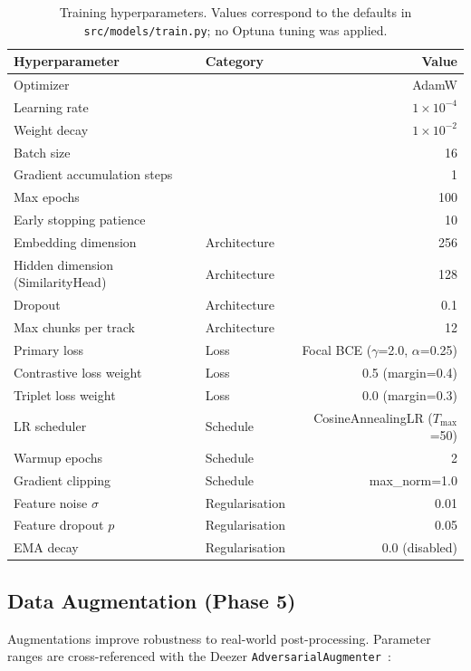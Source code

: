 \documentclass[11pt,a4paper]{article}
\begin{document}
\begin{table}[H]
\centering
\begin{tabular}{llr}
\toprule
\textbf{Hyperparameter} & \textbf{Category} & \textbf{Value} \\
\midrule
Optimizer & & AdamW \\
Learning rate & & $1 \times 10^{-4}$ \\
Weight decay & & $1 \times 10^{-2}$ \\
Batch size & & 16 \\
Gradient accumulation steps & & 1 \\
Max epochs & & 100 \\
Early stopping patience & & 10 \\
\midrule
Embedding dimension & Architecture & 256 \\
Hidden dimension (SimilarityHead) & Architecture & 128 \\
Dropout & Architecture & 0.1 \\
Max chunks per track & Architecture & 12 \\
\midrule
Primary loss & Loss & Focal BCE ($\gamma$=2.0, $\alpha$=0.25) \\
Contrastive loss weight & Loss & 0.5 (margin=0.4) \\
Triplet loss weight & Loss & 0.0 (margin=0.3) \\
\midrule
LR scheduler & Schedule & CosineAnnealingLR ($T_{\max}$=50) \\
Warmup epochs & Schedule & 2 \\
Gradient clipping & Schedule & max\_norm=1.0 \\
\midrule
Feature noise $\sigma$ & Regularisation & 0.01 \\
Feature dropout $p$ & Regularisation & 0.05 \\
EMA decay & Regularisation & 0.0 (disabled) \\
\bottomrule
\end{tabular}
\caption{Training hyperparameters. Values correspond to the defaults in \texttt{src/models/train.py}; no Optuna tuning was applied.}
\label{tab:hyperparams}
\end{table}

\subsection{Data Augmentation (Phase 5)}

Augmentations improve robustness to real-world post-processing. Parameter ranges are cross-referenced with the Deezer \texttt{AdversarialAugmenter}~\cite{B3}:
\end{document}
